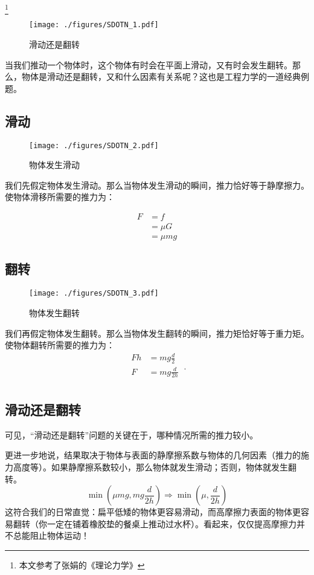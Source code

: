 
\begin{issues}
\issueMissDepend
\end{issues}

\footnote{本文参考了张娟的《理论力学》}

\begin{figure}[ht]
\centering
\texttt{[image: ./figures/SDOTN\_1.pdf]}
\caption{滑动还是翻转} \label{SDOTN_fig1}
\end{figure}

当我们推动一个物体时，这个物体有时会在平面上滑动，又有时会发生翻转。那么，物体是滑动还是翻转，又和什么因素有关系呢？这也是工程力学的一道经典例题。

\subsection{滑动}
\begin{figure}[ht]
\centering
\texttt{[image: ./figures/SDOTN\_2.pdf]}
\caption{物体发生滑动} \label{SDOTN_fig2}
\end{figure}
我们先假定物体发生滑动。那么当物体发生滑动的瞬间，推力恰好等于静摩擦力。使物体滑移所需要的推力为：

\begin{equation}
\begin{aligned}
F&=f\\
&=\mu G\\
&=\mu mg
\end{aligned}
\end{equation}

\subsection{翻转}
\begin{figure}[ht]
\centering
\texttt{[image: ./figures/SDOTN\_3.pdf]}
\caption{物体发生翻转} \label{SDOTN_fig3}
\end{figure}
我们再假定物体发生翻转。那么当物体发生翻转的瞬间，推力矩恰好等于重力矩。使物体翻转所需要的推力为：
\begin{equation}
\begin{aligned}
Fh&=mg \frac{d}{2}\\
F&=mg \frac{d}{2h}\\
\end{aligned}~.
\end{equation}

\subsection{滑动还是翻转}
可见，“滑动还是翻转”问题的关键在于，哪种情况所需的推力较小。

更进一步地说，结果取决于物体与表面的静摩擦系数与物体的几何因素（推力的施力高度等）。如果静摩擦系数较小，那么物体就发生滑动；否则，物体就发生翻转。
\begin{equation}
\min(\mu mg, mg \frac{d}{2h})\Rightarrow
\min(\mu, \frac{d}{2h})
\end{equation}
这符合我们的日常直觉：扁平低矮的物体更容易滑动，而高摩擦力表面的物体更容易翻转（你一定在铺着橡胶垫的餐桌上推动过水杯）。看起来，仅仅提高摩擦力并不总能阻止物体运动！
